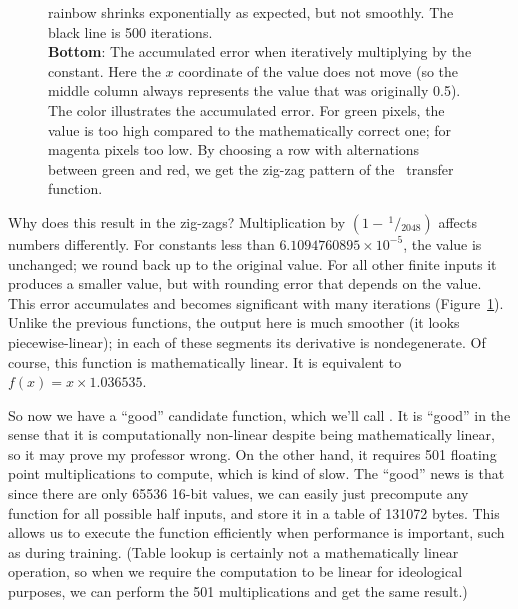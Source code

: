 \documentclass[twocolumn]{article}
\newcommand\sfrac[2]{\!{}\,^{#1}\!/{}\!_{#2}}
\begin{document}
\begin{figure}[t!p]
{    rainbow shrinks exponentially as expected, but not smoothly.
    The black line is 500 iterations.
    \\[1em]
    {\bf Bottom}: The accumulated error when iteratively multiplying
    by the constant. Here the $x$ coordinate of the value does not move
    (so the middle column always represents the value that was
    originally 0.5). The color illustrates the accumulated error. For
    green pixels, the value is too high compared to the mathematically
    correct one; for magenta pixels too low. By choosing a row with
    alternations between green and red, we get the zig-zag pattern of
    the \gradone\ transfer function.
  } \label{fig:rainbow}
\end{figure}

Why does this result in the zig-zags? Multiplication by $(1 -
\sfrac{1}{2048})$ affects numbers differently. For constants less than
$6.1094760895 \times 10^{-5}$, the value is unchanged; we round back up to
the original value. For all other finite inputs it produces a smaller
value, but with rounding error that depends on the value. This error
accumulates and becomes significant with many iterations
(Figure~\ref{fig:rainbow}). Unlike the previous functions, the output
here is much smoother (it looks piecewise-linear); in each of these
segments its derivative is nondegenerate. Of course, this function is
mathematically linear. It is equivalent to $f(x) = x \times 1.036535$.

So now we have a ``good'' candidate function, which we'll call \gradone.
It is ``good'' in the sense that it is computationally non-linear
despite being mathematically linear, so it may prove my professor
wrong. On the other hand, it requires 501 floating point
multiplications to compute, which is kind of slow. The ``good'' news
is that since there are only 65536 16-bit values, we can easily just
precompute any function for all possible half inputs, and store it in
a table of 131072 bytes. This allows us to execute the function
efficiently when performance is important, such as during training.
(Table lookup is certainly not a mathematically linear operation, so
when we require the computation to be linear for ideological purposes,
we can perform the 501 multiplications and get the same result.)
\end{document}
